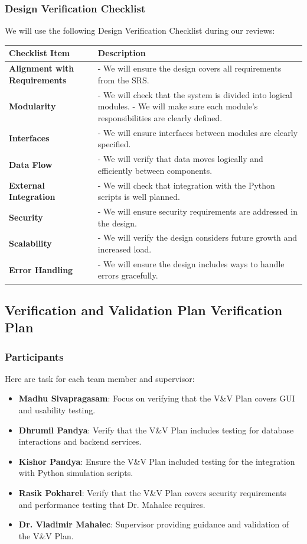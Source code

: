 \documentclass[12pt, titlepage]{article}
\begin{document}
\subsubsection{Design Verification Checklist}
We will use the following Design Verification Checklist during our reviews:
\begin{longtable}{|p{}|p{}|}
  \hline
  \textbf{Checklist Item} & \textbf{Description} \\ \hline
  \textbf{Alignment with Requirements} & 
  - We will ensure the design covers all requirements from the SRS. \\ \hline
  \textbf{Modularity} & 
  - We will check that the system is divided into logical modules. \newline
  - We will make sure each module's responsibilities are clearly defined. \\ \hline
  \textbf{Interfaces} & 
  - We will ensure interfaces between modules are clearly specified. \\ \hline
  \textbf{Data Flow} & 
  - We will verify that data moves logically and efficiently between components. \\ \hline
  \textbf{External Integration} & 
  - We will check that integration with the Python scripts is well planned. \\ \hline
  \textbf{Security} & 
  - We will ensure security requirements are addressed in the design. \\ \hline
  \textbf{Scalability} & 
  - We will verify the design considers future growth and increased load. \\ \hline
  \textbf{Error Handling} & 
  - We will ensure the design includes ways to handle errors gracefully. \\ \hline
  \end{longtable}

\subsection{Verification and Validation Plan Verification Plan}


\subsubsection{Participants}
Here are task for each team member and supervisor:
\begin{itemize}
    \item \textbf{Madhu Sivapragasam}: Focus on verifying that the V\&V Plan covers GUI and usability testing.
    \item \textbf{Dhrumil Pandya}: Verify that the V\&V Plan includes testing for database interactions and backend services.
    \item \textbf{Kishor Pandya}: Ensure the V\&V Plan included testing for the integration with Python simulation scripts.
    \item \textbf{Rasik Pokharel}: Verify that the V\&V Plan covers security requirements and performance testing that Dr. Mahalec requires.
    \item \textbf{Dr. Vladimir Mahalec}: Supervisor providing guidance and validation of the V\&V Plan.
\end{itemize}
\end{document}
